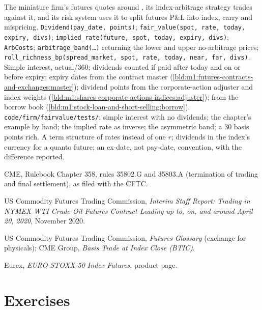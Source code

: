 \begin{build}
 The miniature firm's futures  quotes around
, its index-arbitrage strategy trades against it, and its risk
system uses it to split futures P\&L into index, carry and mispricing.
 \texttt{Dividend(pay\_date, points)};
\texttt{fair\_value(spot, rate, today, expiry, divs)};
\texttt{implied\_rate(future, spot, today, expiry, divs)};
\texttt{ArbCosts}; \texttt{arbitrage\_band(\ldots)} returning the lower and
upper no-arbitrage prices; \texttt{roll\_richness\_bp(spread\_market, spot,
rate, today, near, far, divs)}.
 Simple interest, actual/360; dividends counted if paid after
today and on or before expiry; expiry dates from the contract master
(\cref{bld:m1:futures-contracts-and-exchanges:master}); dividend points from
the corporate-action adjuster and index weights
(\cref{bld:m1:shares-corporate-actions-indices:adjuster});  from
the borrow book (\cref{bld:m1:stock-loan-and-short-selling:borrow}).
 \texttt{code/firm/fairvalue/tests/}: simple
interest with no dividends; the chapter's example by hand; the implied rate
as inverse; the asymmetric band; a  30 basis points rich.
 A term structure of rates instead of one $r$; dividends in
the index's currency for a quanto future; an ex-date, not pay-date,
convention, with the difference reported.
\end{build}

\begin{omsources}
\item CME, Rulebook Chapter 358, rules 35802.G and 35803.A (termination of
trading and final settlement), as filed with the CFTC.
\item US Commodity Futures Trading Commission, \emph{Interim Staff Report:
Trading in NYMEX WTI Crude Oil Futures Contract Leading up to, on, and around
April 20, 2020}, November 2020.
\item US Commodity Futures Trading Commission, \emph{Futures Glossary}
(exchange for physicals); CME Group, \emph{Basis Trade at Index Close (BTIC)}.
\item Eurex, \emph{EURO STOXX 50 Index Futures}, product page.
\end{omsources}

\section{Exercises}

